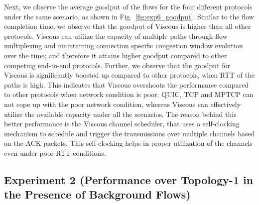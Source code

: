 Next, we observe the average goodput of the flows for the four different protocols under the same scenario, as shown in Fig.~\ref{fig:exp6_goodput}. Similar to the flow completion time, we observe that the goodput of Viscous is higher than all other protocols. Viscous can utilize the capacity of multiple paths through flow multiplexing and maintaining connection specific congestion window evolution over the time; and therefore it attains higher goodput compared to other competing end-to-end protocols. Further, we observe that the goodput for Viscous is significantly boosted up compared to other protocols, when RTT of the paths is high. This indicates that Viscous overshoots the performance compared to other protocols when network condition is poor. QUIC, TCP and MPTCP can not cope up with the poor network condition, whereas Viscous can effectively utilize the available capacity under all the scenarios. The reason behind this better performance is the Viscous channel scheduler, that uses a self-clocking mechanism to schedule and trigger the transmissions over multiple channels based on the ACK packets. This self-clocking helps in proper utilization of the channels even under poor RTT conditions. 


\subsection{Experiment 2 (Performance over Topology-1 in the Presence of Background Flows)}

